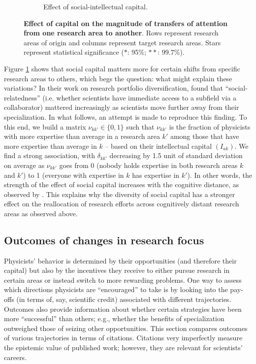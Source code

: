 \documentclass{article}
\begin{document}
\begin{figure}[h]
\begin{subfigure}{.5\textwidth}
    \caption{Effect of social-intellectual capital.}
    \label{fig:social-capital-effect}
\end{subfigure}
\caption{\textbf{Effect of capital on the magnitude of transfers of attention from one research area to another}. Rows represent research areas of origin and columns represent target research areas. Stars represent statistical significance ($\ast$: 95\%; $\ast\ast$: 99.7\%).}
\label{fig:test}
\end{figure}

Figure \ref{fig:social-capital-effect} shows that social capital matters more for certain shifts from specific research areas to others, which begs the question: what might explain these variations? In their work on research portfolio diversification, \citet{Tripodi2020} found that ``social-relatedness'' (i.e. whether scientists have immediate access to a subfield via a collaborator) mattered increasingly as scientists move further away from their specialization. In what follows, an attempt is made to reproduce this finding. To this end, we build a matrix $\nu_{kk'}\in\{0,1\}$ such that $\nu_{kk'}$ is the fraction of physicists with more expertise than average in a research area $k'$ among those that have more expertise than average in $k$ -- based on their intellectual capital $(I_{ak})$. We find a strong association, with $\delta_{kk'}$ decreasing by 1.5 unit of standard deviation on average as $\nu_{kk'}$ goes from 0 (nobody holds expertise in both research areas $k$ and $k'$) to 1 (everyone with expertise in $k$ has expertise in $k'$). In other words, the strength of the effect of social capital increases with the cognitive distance, as observed by \citet{Tripodi2020}. This explains why the diversity of social capital has a stronger effect on the reallocation of research efforts across cognitively distant research areas as observed above.





\subsection{\label{sec:outcomes}Outcomes of changes in research focus}

Physicists' behavior is determined by their opportunities (and therefore their capital) but also by the incentives they receive to either pursue research in certain areas or instead switch to more rewarding problems. One way to assess which directions physicists are ``encouraged'' to take is by looking into the pay-offs (in terms of, say, scientific credit) associated with different trajectories. Outcomes also provide information about whether certain strategies have been more ``successful'' than others; e.g., whether the benefits of specialization outweighed those of seizing other opportunities. This section compares outcomes of various trajectories in terms of citations. Citations very imperfectly measure the epistemic value of published work; however, they are relevant for scientists' careers. 
\end{document}
